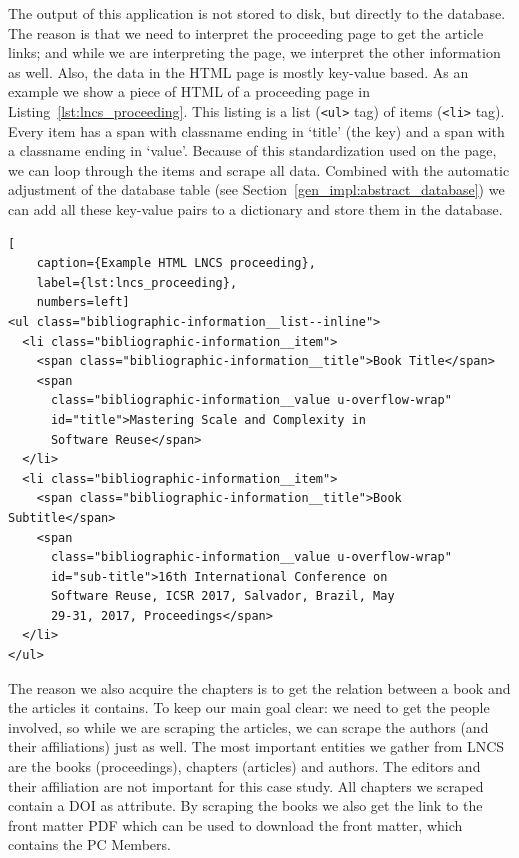 \documentclass{ou-report}
\newcommand{\doi}{{DOI}}
\newcommand{\lncs}{LNCS}
\begin{document}
The output of this application is not stored to disk, but directly to the 
database. The reason is
that we need to interpret the proceeding page to get the article links; and while
we are interpreting the page, we interpret the other information as well. Also,
the data in the HTML page is mostly key-value based. As an example we show a 
piece of HTML of a proceeding page in Listing~\ref{lst:lncs_proceeding}.
This listing is a list (\verb|<ul>| tag) of items (\verb|<li>| tag). Every 
item has a span with classname ending in `title' 
(the key) and a span with a classname ending in `value'. Because of this 
standardization used
on the page, we can loop through the items and scrape all data. 
Combined with the automatic adjustment of the database table (see
Section~\ref{gen_impl:abstract_database}) we can add all these key-value pairs
to a dictionary and store them in the database.

\lstset{language=HTML}
\begin{lstlisting}[
    caption={Example HTML LNCS proceeding},
    label={lst:lncs_proceeding},
    numbers=left]
<ul class="bibliographic-information__list--inline">
  <li class="bibliographic-information__item">
    <span class="bibliographic-information__title">Book Title</span>
    <span
      class="bibliographic-information__value u-overflow-wrap"
      id="title">Mastering Scale and Complexity in
      Software Reuse</span>
  </li>
  <li class="bibliographic-information__item">
    <span class="bibliographic-information__title">Book Subtitle</span>
    <span
      class="bibliographic-information__value u-overflow-wrap"
      id="sub-title">16th International Conference on
      Software Reuse, ICSR 2017, Salvador, Brazil, May
      29-31, 2017, Proceedings</span>
  </li>
</ul>
\end{lstlisting}

The reason we also acquire the chapters is to get the relation between a book
and the articles it contains. To keep our main goal clear: we need to get the
people involved, so while we are scraping the articles, we can scrape the
authors (and their affiliations) just as well.
The most important entities we gather from \lncs{} are the books (proceedings), 
chapters (articles) and authors. The editors and their affiliation are not 
important for this case study. 
All chapters we scraped contain a \doi{} as attribute. 
By scraping the books we also get the link to the front matter PDF which can be 
used to download the front matter, which contains the PC Members.
\end{document}
